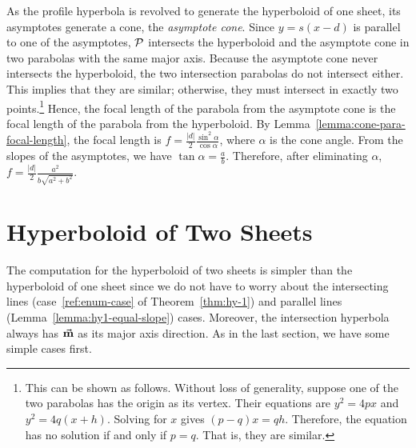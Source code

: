      As the profile hyperbola is revolved to generate the hyperboloid
of one sheet, its asymptotes generate a cone, the {\em asymptote cone}.
Since $y=s(x-d)$ is parallel to one of the asymptotes, ${\cal P}$ intersects
the hyperboloid and the asymptote cone in two parabolas with the same major
axis.  Because the asymptote cone never intersects the hyperboloid, the two
intersection parabolas do not intersect either.  This implies that they
are similar; otherwise, they must intersect in exactly two 
points.\footnote{This can be shown as follows.  Without loss of generality, 
suppose one of the two parabolas has the origin as its vertex.  Their 
equations are $y^2=4px$ and $y^2=4q(x+h)$.  Solving for $x$ gives
$(p-q)x=qh$.  Therefore, the equation has no solution if and only if $p=q$.
That is, they are similar.} Hence, the focal length of the parabola from the 
asymptote cone is the focal length of the parabola from the hyperboloid.  
By Lemma~\ref{lemma:cone-para-focal-length}, the focal length is
$f=\frac{|d|}{2}\frac{\sin^2\alpha}{\cos\alpha}$, where $\alpha$ is the cone
angle.  From the slopes of the asymptotes, we have $\tan\alpha=\frac{a}{b}$.
Therefore, after eliminating $\alpha$, 
$f=\frac{|d|}{2}\frac{a^2}{b\sqrt{a^2+b^2}}$. \QED


\section{Hyperboloid of Two Sheets}
\label{section:hy2}

     The computation for the hyperboloid of two sheets is simpler than the
hyperboloid of one sheet since we do not have to worry about the intersecting
lines (case~\ref{ref:enum-case} of Theorem~\ref{thm:hy-1})
and parallel lines (Lemma~\ref{lemma:hy1-equal-slope}) cases.  
Moreover, the intersection hyperbola always has
$\vec{\bf m}$ as its major axis direction.  As in the last section, we have some
simple cases first.

